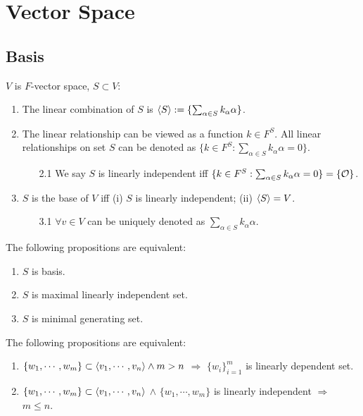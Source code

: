 \chapter{Vector Space}

\section{Basis}

$V$ is $F$\mbox{-}vector space, $S \subset V$:
\begin{enumerate}
    \item The linear combination of $S$ is $\langle S \rangle := \{ \sum_{\alpha \in S} k_{\alpha} \alpha \}$.
    \item The linear relationship can be viewed as a function $k \in F^S$. All linear relationships on set $S$ can be denoted as $\{ k \in F^S : \sum_{\alpha \in S} k_{\alpha} \alpha = 0 \}$.
    \begin{enumerate}
        \item[2.1] We say $S$ is linearly independent iff $\{ k \in F^S : \sum_{\alpha \in S} k_{\alpha} \alpha = 0 \} = \{ {\cal O} \}$.
    \end{enumerate}
    \item $S$ is the base of $V$ iff (i) $S$ is linearly independent; (ii) $\langle S \rangle = V$.
    \begin{enumerate}
        \item[3.1] $\forall v \in V$ can be uniquely denoted as $\sum_{\alpha \in S} k_{\alpha} \alpha$.
    \end{enumerate}
\end{enumerate}





\begin{proposition}
    The following propositions are equivalent:
    \begin{enumerate}
        \item $S$ is basis.
        \item $S$ is maximal linearly independent set.
        \item $S$ is minimal generating set.
    \end{enumerate}
\end{proposition}





\begin{proposition}
    The following propositions are equivalent:
    \begin{enumerate}
        \item $\{ w_1, \cdots, w_m \} \subset \langle v_1 ,\cdots, v_n \rangle \land m > n$ $\Rightarrow$ $\{w_i\}_{i=1}^m$ is linearly dependent set.
        \item  $\{ w_1, \cdots, w_m \} \subset \langle v_1 ,\cdots, v_n \rangle$ $\land$ $\{ w_1, \cdots, w_m \}$ is linearly independent $\Rightarrow$ $m \leq n$.
    \end{enumerate}
\end{proposition}





